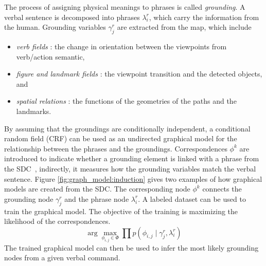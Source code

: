 \documentclass[phd]{byuprop}
\begin{document}
The process of assigning physical meanings to phrases is called {\em grounding}.
A verbal sentence is decomposed into phrases $ \lambda^{r}_{i} $, which carry the information from the human.
Grounding variables $ \gamma^{r}_{j} $ are extracted from the map, which include
\begin{itemize}
\item {\em verb fields} : the change in orientation between the viewpoints from verb/action semantic,
\item {\em figure and landmark fields} : the viewpoint transition and the detected objects, and
\item {\em spatial relations} : the functions of the geometries of the paths and the landmarks.
\end{itemize}
By assuming that the groundings are conditionally independent, a conditional random field (CRF) can be used as an undirected graphical model for the relationship between the phrases and the groundings.
Correspondences $ \phi^{k} $ are introduced to indicate whether a grounding element is linked with a phrase from the SDC~\cite{tellex2011understanding},
indirectly, it measures how the grounding variables match the verbal sentence.
Figure \ref{fig:graph_model:induction} gives two examples of how graphical models are created from the SDC.
The corresponding node $ \phi^{k} $ connects the grounding node $ \gamma^{r}_{j} $ and the phrase node $ \lambda^{r}_{i} $.
A labeled dataset can be used to train the graphical model.
The objective of the training is maximizing the likelihood of the correspondences.
\begin{equation}
\arg \max_{\phi_{i,j} \in \Phi } \prod p( \phi_{i,j} \mid \gamma^{r}_{j} , \lambda^{r}_{i} )
\end{equation}
The trained graphical model can then be used to infer the most likely grounding nodes from a given verbal command.
\end{document}
